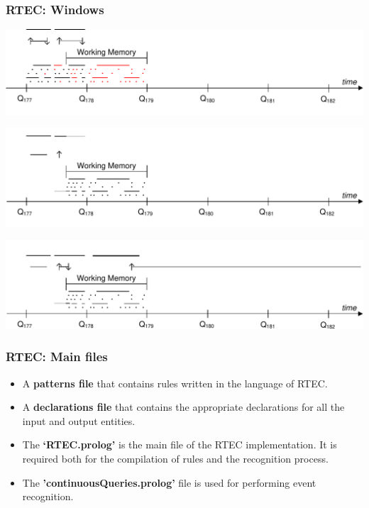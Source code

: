 \documentclass{beamer}
\begin{document}

\begin{frame}[fragile]
\frametitle{RTEC: Windows}
\begin{center}
\includegraphics[width=0.8\linewidth]{./graphics/windows1.pdf}
\pause

\includegraphics[width=0.8\linewidth]{./graphics/windows2.pdf}
\pause

\includegraphics[width=0.8\linewidth]{./graphics/windows3.pdf}

\end{center}
\end{frame}


\begin{frame}[fragile]
\frametitle{RTEC: Main files}
\begin{itemize}
 \item A \textbf{patterns file} that contains rules written in the language of RTEC.
 \item A \textbf{declarations file} that contains the appropriate declarations for all the input and output entities. 
 \item The \textbf{`RTEC.prolog'} is the main file of the RTEC implementation. It is required both for the compilation of rules and the recognition process.
 \item The \textbf{'continuousQueries.prolog'} file is used for performing event recognition.
\end{itemize}
\end{frame}
\end{document}
